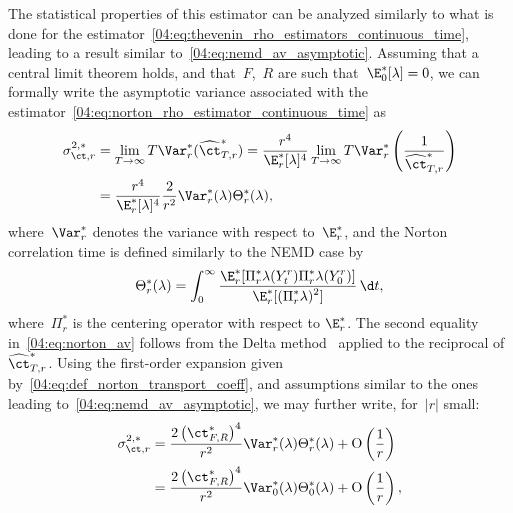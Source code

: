 The statistical properties of this estimator can be analyzed similarly to what is done for the estimator~\eqref{04:eq:thevenin_rho_estimators_continuous_time}, leading to a result similar to~\eqref{04:eq:nemd_av_asymptotic}.
Assuming that a central limit theorem holds, and that~$F$,~$R$ are such that~$\E_0^*[\lambda]=0$, we can formally write the asymptotic variance associated with the estimator~\eqref{04:eq:norton_rho_estimator_continuous_time} as
\begin{equation}
    \label{04:eq:norton_av}
    \begin{aligned}
    \sigma_{\ct,r}^{2,*} &= \lim_{T\to \infty} T\Var^*_r(\widehat{\ct}_{T,r}^*)
     = \frac{r^4}{\E_{r}^*[\lambda]^4}\lim_{T\to \infty} T\Var^*_r\left(\frac{1}{\widehat{\ct}_{T,r}^*}\right)\\
    & = \frac{r^4}{\E_{r}^*[\lambda]^4}\frac{2}{r^2}\Var_r^*(\lambda)\Theta_r^*(\lambda),
        \end{aligned}
\end{equation}
where~$\Var_r^*$ denotes the variance with respect to~$\E_r^*$, and the Norton correlation time is defined similarly to the NEMD case by 
\begin{equation}
    \label{04:eq:norton_correlation_time}
    \Theta_{r}^*(\lambda) = \int_{0}^\infty \frac{\displaystyle{\E_r^*[\Pi^*_r\lambda(Y_t^r)\Pi^*_r\lambda(Y_0^r)]}}{\displaystyle{\E_r^*[(\Pi^*_r\lambda)^2]}}\,\d t,
\end{equation}
where~$\Pi_r^*$ is the centering operator with respect to $\E_r^*$.
The second equality in~\eqref{04:eq:norton_av} follows from the Delta method~\cite[Chapter 3]{VDV00} applied to the reciprocal of~$\widehat{\ct}_{T,r}^*$. Using the first-order expansion given by~\eqref{04:eq:def_norton_transport_coeff}, and assumptions similar to the ones leading to~\eqref{04:eq:nemd_av_asymptotic}, we may further write, for~$|r|$ small:
\begin{equation*}
    \begin{aligned}
            \sigma_{\ct,r}^{2,*} &= \frac{2\left(\ct_{F,R}^{*}\right)^4}{r^2}\Var_r^*(\lambda)\Theta_r^*(\lambda) + \mathrm{O}\left(\frac1r\right)\\
    &= \frac{2\left(\ct_{F,R}^{*}\right)^4}{r^2}\Var_0^*(\lambda)\Theta_0^*(\lambda) + \mathrm{O}\left(\frac1r\right),
    \end{aligned}
\end{equation*}

